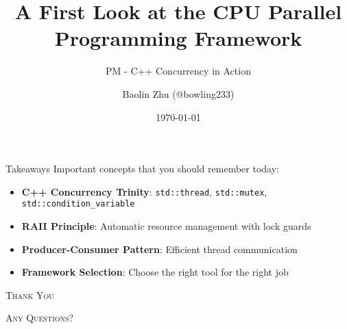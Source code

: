 \documentclass{zjusct-beamer/zjusctbeamer}
\title{A First Look at the CPU Parallel Programming Framework}
\subtitle{PM - C++ Concurrency in Action}
\author[bowling233]{Baolin Zhu (@bowling233)}
\date{\today}
\institute[ZJUSCT]{Zhejiang University Supercomputing Team}
\begin{document}
\setmonofont{DejaVu Sans Mono}

\maketitle

\cutoc








\begin{frame}[fragile]{Takeaways}
	 Important concepts that you should remember today:
	\begin{itemize}
		\item \textbf{C++ Concurrency Trinity}: \texttt{std::thread}, \texttt{std::mutex}, \texttt{std::condition\_variable}
		\item \textbf{RAII Principle}: Automatic resource management with lock guards
		\item \textbf{Producer-Consumer Pattern}: Efficient thread communication
		\item \textbf{Framework Selection}: Choose the right tool for the right job
	\end{itemize}
\end{frame}

\begin{frame}[standout]
	\Huge\textsc{Thank You}

	\vfill

	\LARGE\textsc{Any Questions?}
\end{frame}
\end{document}
